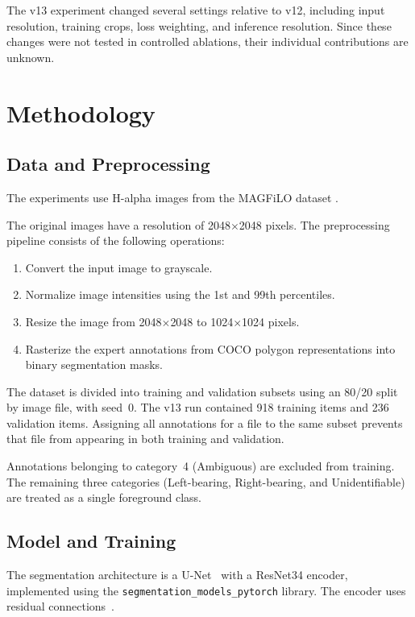 \documentclass[sigconf,nonacm]{acmart}
\begin{document}
The v13 experiment changed several settings relative to v12,
including input resolution, training crops, loss weighting, and
inference resolution. Since these changes were not tested in
controlled ablations, their individual contributions are unknown.


\section{Methodology}

\subsection{Data and Preprocessing}

The experiments use H-alpha images from the MAGFiLO dataset
\cite{magfilo}.

The original images have a resolution of 2048$\times$2048 pixels.
The preprocessing pipeline consists of the following operations:

\begin{enumerate}
    \setlength{\itemsep}{0.1em}
    \setlength{\topsep}{0.2em}
    \item Convert the input image to grayscale.
    \item Normalize image intensities using the 1st and 99th
          percentiles.
    \item Resize the image from 2048$\times$2048 to
          1024$\times$1024 pixels.
    \item Rasterize the expert annotations from COCO polygon
          representations into binary segmentation masks.
\end{enumerate}

The dataset is divided into training and validation subsets
using an 80/20 split by image file, with seed~0. The v13 run
contained 918 training items and 236 validation items. Assigning
all annotations for a file to the same subset prevents that file
from appearing in both training and validation.

Annotations belonging to category~4 (Ambiguous) are excluded
from training. The remaining three categories (Left-bearing,
Right-bearing, and Unidentifiable) are treated as a single
foreground class.


\subsection{Model and Training}

The segmentation architecture is a U-Net~\cite{unet} with a ResNet34
encoder, implemented using the
\texttt{segmentation\_\allowbreak{}models\_\allowbreak{}pytorch}
library. The encoder uses
residual connections~\cite{resnet}.
\end{document}
